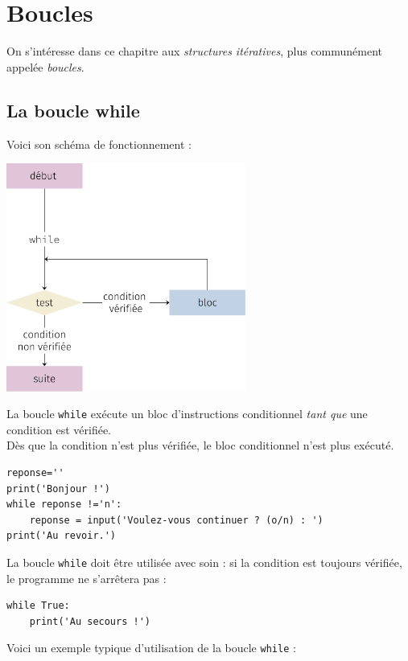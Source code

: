 \chapter{Boucles}
On s'intéresse dans ce chapitre aux \textit{structures itératives}, plus communément appelée \textit{boucles}.\\


\section{La boucle while}

Voici son schéma de fonctionnement :
\begin{center}
    \includegraphics[height=7.5cm]{ch-boucles/img/while.png}
\end{center}

La boucle \texttt{while} exécute un bloc d'instructions conditionnel \textit{tant que} une condition est vérifiée.\\
Dès que la condition n'est plus vérifiée, le bloc conditionnel n'est plus exécuté.

\begin{pyc}
\begin{verbatim}
reponse=''
print('Bonjour !')
while reponse !='n':
    reponse = input('Voulez-vous continuer ? (o/n) : ')
print('Au revoir.')
\end{verbatim}
\end{pyc}
La boucle \texttt{while} doit être utilisée avec soin : si la condition est toujours vérifiée, le programme ne s'arrêtera pas :

\begin{pyc}
\begin{verbatim}
while True:
    print('Au secours !')
\end{verbatim}
\end{pyc}
Voici un exemple typique d'utilisation de la boucle \texttt{while} : \\

